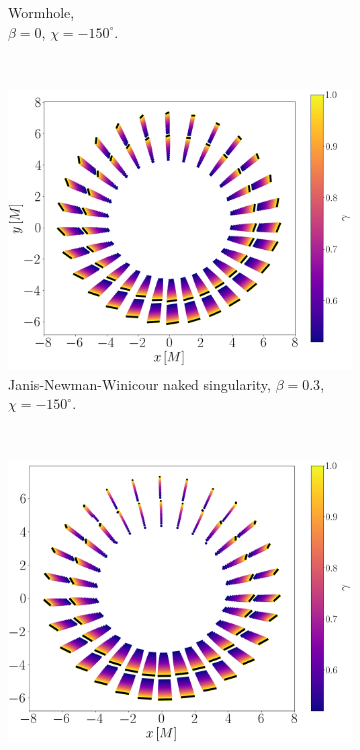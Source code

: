 \documentclass[12pt]{article}
\numberwithin{equation}{section}
\numberwithin{figure}{section}
\begin{document}
\begin{figure}[!htb]
\begin{subfigure}{7cm}
			\caption{Wormhole, \\$\beta = 0$, $\chi = -150^\circ$.}
		\end{subfigure}\\
		\begin{subfigure}{7cm}
			\hspace{0.0em}
			\includegraphics[scale = 0.23]{Section_7_Polarized_Emission/JNW_alpha_Vert_Field.png}
			\caption{Janis-Newman-Winicour naked singularity, $\beta = 0.3$, $\chi = -150^\circ$.} 
		\end{subfigure}\,\,\,
		\begin{subfigure}{7cm}
			\hspace{0.2em}
			\includegraphics[scale = 0.23]{Section_7_Polarized_Emission/JNW_alpha_Vert_Field_beta_zero.png}

\end{subfigure}
\end{figure}
\end{document}
